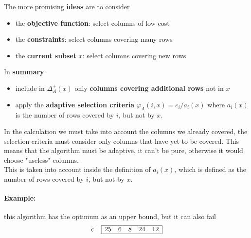 \documentclass[11pt]{article}
\begin{document}
	The more promising \textbf{ideas} are to consider
	\begin{itemize}
		\item the \textbf{objective function}: select columns of low cost
		\item the \textbf{constraints}: select columns covering many rows
		\item the \textbf{current subset} $x$: select columns covering new rows
	\end{itemize}
	
	In \textbf{summary}
	\begin{itemize}
		\item include in $\Delta_A^+ (x)$ only \textbf{columns covering additional rows} not in $x$
		\item apply the \textbf{adaptive selection criteria} $\varphi_A (i, x) = c_i / a_i (x)$ where $a_i (x)$ is the number of rows covered by $i$, but not by $x$. 
	\end{itemize}
	
	In the calculation we must take into account the columns we already covered, the selection criteria must consider only columns that have yet to be covered. This means that the algorithm must be adaptive, it can't be pure, otherwise it would choose "useless" columns.\\
	This is taken into account inside the definition of $a_i (x)$, which is defined as the number of rows covered by $i$, but not by $x$. \\
	
	\newpage
	
	\paragraph{Example:} this algorithm has the optimum as an upper bound, but it can also fail
	$$
	c \;\;\;\;
	\begin{array}{| c c c c c |}
		\hline
		25 & 6 & 8 & 24 & 12 \\
		\hline
	\end{array}
	$$
	
\end{document}
